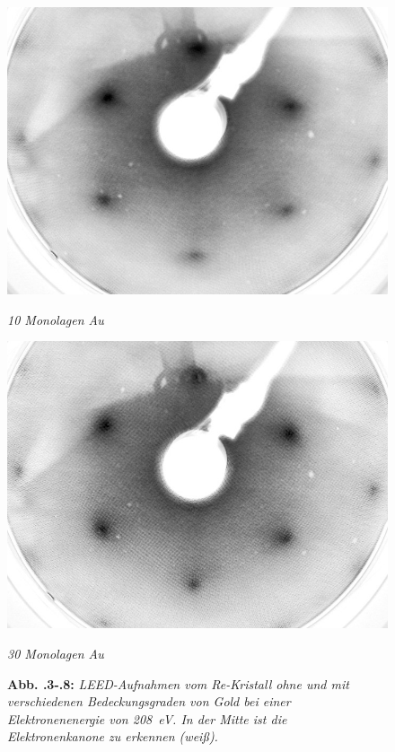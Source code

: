 \begin{minipage}{\linewidth}
\begin{figure}[H]
	\begin{minipage}[b]{0.5\textwidth} 
		\includegraphics[width=\textwidth]{LEED-Bilder/bearbeitet/10ML_E207}
		\caption{\textit{10 Monolagen Au}}
		\label{10ML} 
	\end{minipage}
	\hfill
	\begin{minipage}[b]{0.5\textwidth}
		\includegraphics[width=\textwidth]{LEED-Bilder/bearbeitet/30ML_E208}
		\caption{\textit{30 Monolagen Au}}
		\label{30ML} 
	\end{minipage}
	\caption*{\textbf{Abb. \thechapter.3-\thechapter.8:} \textit{LEED-Aufnahmen vom Re-Kristall ohne
	und mit verschiedenen Bedeckungsgraden von Gold bei einer Elektronenenergie von \SI{208}{eV}. In
	der Mitte ist die Elektronenkanone zu erkennen (weiß).}}
\end{figure}
\end{minipage}
